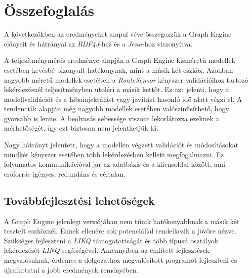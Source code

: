 \chapter{Összefoglalás}

A következőkben az eredményeket alapul véve összegezzük a Graph Engine előnyeit és hátrányai az \emph{RDF4J}-hez és a \emph{Jena}-hoz viszonyítva. 

A teljesítménymérés eredménye alapján a Graph Engine  kisméretű modellek esetében kevésbé bizonyult hatékonynak, mint a másik két eszköz. Azonban nagyobb méretű modellek esetében a \emph{RouteSensor} kényszer validációihoz tartozó lekérdezésnél teljesítményben utoléri a másik kettőt. Ez azt jelenti, hogy a modellvalidációt és a hibainjektálást vagy javítást hasonló idő alatt végzi el. A tendenciák alapján még nagyobb modellek esetében valószínűsíthető, hogy gyorsabb is lenne.  A beolvasás sebessége viszont lekorlátozza ezeknek a mérhetőségét, így ezt biztosan nem jelenthetjük ki.

Nagy hátrányt jelentett, hogy a modellen végzett validációt és módosításokat mindkét kényszer esetében több lekérdezésben kellett megfogalmazni. Ez folyamatos kommunikációval jár az adatbázis és a kliensoldal között, ami erőforrás-igényes, redundáns és céltalan.

\section{Továbbfejlesztési lehetőségek}

A Graph Engine jelenlegi verziójában nem tűnik hatékonyabbnak a másik két tesztelt eszköznél. Ennek ellenére sok potenciállal rendelkezik a jövőre nézve. Szükséges fejleszteni a \emph{LIKQ} támogatottságát és több típusú osztályok lekérdezését \emph{LINQ} segítségével. Amennyiben az említett fejlesztések megvalósulnak, érdemes a dolgozathoz megvalósított programot fejleszteni és újrafuttatni a jobb eredmények reményében.